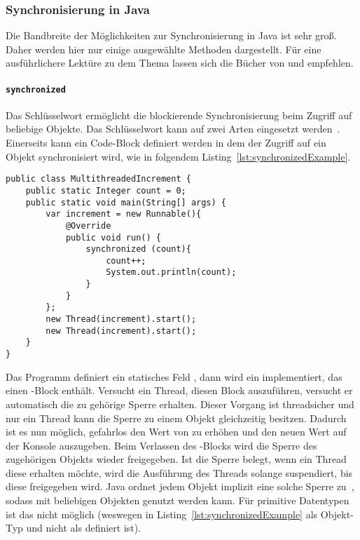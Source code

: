 \subsubsection{Synchronisierung in Java}
Die Bandbreite der Möglichkeiten zur Synchronisierung in Java ist sehr groß. Daher werden hier nur einige ausgewählte Methoden dargestellt. Für eine ausführlichere Lektüre zu dem Thema lassen sich die Bücher von \textcite{Friesen2015} und \textcite{Hettel2016} empfehlen.

\paragraph{\texttt{synchronized}} Das Schlüsselwort  ermöglicht die blockierende Synchronisierung beim Zugriff auf beliebige Objekte. Das Schlüsselwort kann auf zwei Arten eingesetzt werden~\Cite[S.~339~ff.]{Rauber2006}. Einerseits kann ein Code-Block definiert werden in dem der Zugriff auf ein Objekt synchronisiert wird, wie in folgendem Listing~\ref{lst:synchronizedExample}.
\begin{lstlisting}[caption={[Beispiel eines Java-\glsentryuseri{Programm} mit Nutzung von \code{synchronized}.]Beispiel eines Java-\glsuseri{Programm}, das \code{synchronized} zur Synchronisierung nebenläufiger \glspl{Anweisung} nutzt.}, label={lst:synchronizedExample}]
public class MultithreadedIncrement {
	public static Integer count = 0;
	public static void main(String[] args) {
		var increment = new Runnable(){
			@Override
			public void run() {
				synchronized (count){
					count++;
					System.out.println(count);
				}
			}
		};
		new Thread(increment).start();
		new Thread(increment).start();
	}
}	
\end{lstlisting}
Das \gls{Programm} definiert ein statisches Feld , dann wird ein  implementiert, das einen -Block enthält. Versucht ein Thread, diesen Block auszuführen, versucht er automatisch die zu  gehörige Sperre erhalten. Dieser Vorgang ist threadsicher und nur ein Thread kann die Sperre zu einem Objekt gleichzeitig besitzen. Dadurch ist es nun möglich, gefahrlos den Wert von  zu erhöhen und den neuen Wert auf der Konsole auszugeben. Beim Verlassen des -Blocks wird die Sperre des zugehörigen Objekts wieder freigegeben. Ist die Sperre belegt, wenn ein Thread diese erhalten möchte, wird die Ausführung des Threads solange suspendiert, bis diese freigegeben wird. Java ordnet jedem Objekt implizit eine solche Sperre zu~\cite{Friesen2015}, sodass  mit beliebigen Objekten genutzt werden kann. Für primitive Datentypen ist das nicht möglich (weswegen  in Listing~\ref{lst:synchronizedExample} als Objekt-Typ  und nicht als  definiert ist).

